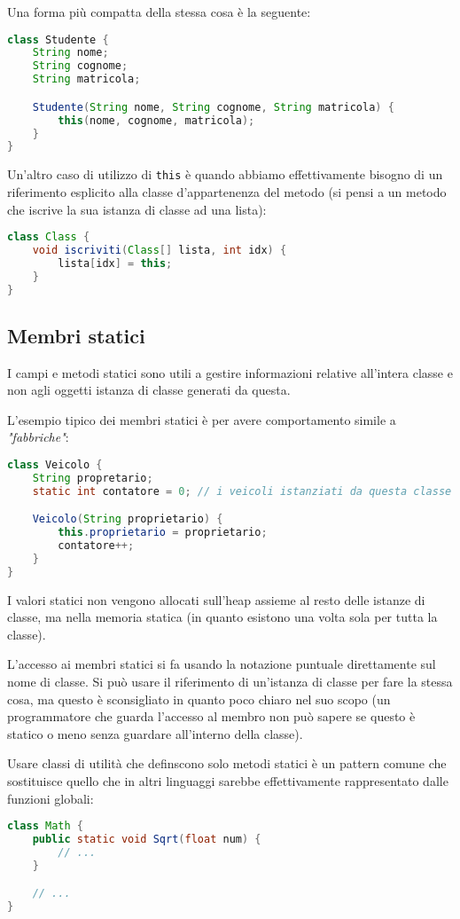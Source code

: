 \documentclass[a4paper,11pt]{article}
\begin{document}
Una forma più compatta della stessa cosa è la seguente:
\begin{lstlisting}[language=java, style=codestyle]	
class Studente {
	String nome;
	String cognome;
	String matricola;

	Studente(String nome, String cognome, String matricola) {
		this(nome, cognome, matricola);
	}
}
\end{lstlisting}

Un'altro caso di utilizzo di \lstinline|this| è quando abbiamo effettivamente bisogno di un riferimento esplicito alla classe d'appartenenza del metodo (si pensi a un metodo che iscrive la sua istanza di classe ad una lista):
\begin{lstlisting}[language=java, style=codestyle]	
class Class {
	void iscriviti(Class[] lista, int idx) {
		lista[idx] = this;
	}
}
\end{lstlisting}

\subsection{Membri statici}
I campi e metodi statici sono utili a gestire informazioni relative all'intera classe e non agli oggetti istanza di classe generati da questa.

L'esempio tipico dei membri statici è per avere comportamento simile a \textit{"fabbriche"}:
\begin{lstlisting}[language=java, style=codestyle]	
class Veicolo {
	String propretario;
	static int contatore = 0; // i veicoli istanziati da questa classe 

	Veicolo(String proprietario) {
		this.proprietario = proprietario;
		contatore++;
	}
}
\end{lstlisting}

I valori statici non vengono allocati sull'heap assieme al resto delle istanze di classe, ma nella memoria statica (in quanto esistono una volta sola per tutta la classe).

L'accesso ai membri statici si fa usando la notazione puntuale direttamente sul nome di classe.
Si può usare il riferimento di un'istanza di classe per fare la stessa cosa, ma questo è sconsigliato in quanto poco chiaro nel suo scopo (un programmatore che guarda l'accesso al membro non può sapere se questo è statico o meno senza guardare all'interno della classe).

Usare classi di utilità che definscono solo metodi statici è un pattern comune che sostituisce quello che in altri linguaggi sarebbe effettivamente rappresentato dalle funzioni globali:
\begin{lstlisting}[language=java, style=codestyle]	
class Math {
	public static void Sqrt(float num) {
		// ...
	}

	// ...
}
\end{lstlisting}
\end{document}
